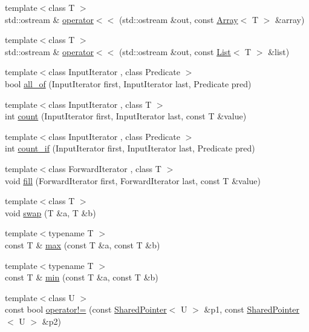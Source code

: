 \begin{DoxyCompactItemize}
\item 
{\footnotesize template$<$class T $>$ }\\std\+::ostream \& \hyperlink{namespaceprism_a403ca8f79c481a89132691c0fd8c3a06}{operator$<$$<$} (std\+::ostream \&out, const \hyperlink{classprism_1_1_array}{Array}$<$ T $>$ \&array)
\item 
{\footnotesize template$<$class T $>$ }\\std\+::ostream \& \hyperlink{namespaceprism_a50da64555d454821545fe0311fde6a62}{operator$<$$<$} (std\+::ostream \&out, const \hyperlink{classprism_1_1_list}{List}$<$ T $>$ \&list)
\item 
{\footnotesize template$<$class Input\+Iterator , class Predicate $>$ }\\bool \hyperlink{namespaceprism_aba366b328f3b6161e6115c16b7153c6d}{all\+\_\+of} (Input\+Iterator first, Input\+Iterator last, Predicate pred)
\item 
{\footnotesize template$<$class Input\+Iterator , class T $>$ }\\int \hyperlink{namespaceprism_a024117fc3639cdf6598509edf22f034a}{count} (Input\+Iterator first, Input\+Iterator last, const T \&value)
\item 
{\footnotesize template$<$class Input\+Iterator , class Predicate $>$ }\\int \hyperlink{namespaceprism_af0007d361beae18a930b6249752e509e}{count\+\_\+if} (Input\+Iterator first, Input\+Iterator last, Predicate pred)
\item 
{\footnotesize template$<$class Forward\+Iterator , class T $>$ }\\void \hyperlink{namespaceprism_a7c33653a5b4a07b31f5bde15e9085b45}{fill} (Forward\+Iterator first, Forward\+Iterator last, const T \&value)
\item 
{\footnotesize template$<$class T $>$ }\\void \hyperlink{namespaceprism_a6430516ab4f2e2a7f43323acb6b559d8}{swap} (T \&a, T \&b)
\item 
{\footnotesize template$<$typename T $>$ }\\const T \& \hyperlink{namespaceprism_a812456273adfa37979e79f07e731d412}{max} (const T \&a, const T \&b)
\item 
{\footnotesize template$<$typename T $>$ }\\const T \& \hyperlink{namespaceprism_a10aff0aca673fb1837069dd8967e4738}{min} (const T \&a, const T \&b)
\item 
{\footnotesize template$<$class U $>$ }\\const bool \hyperlink{namespaceprism_a9df924e4deb059bf1200701c8235410a}{operator!=} (const \hyperlink{classprism_1_1_shared_pointer}{Shared\+Pointer}$<$ U $>$ \&p1, const \hyperlink{classprism_1_1_shared_pointer}{Shared\+Pointer}$<$ U $>$ \&p2)

\end{DoxyCompactItemize}
